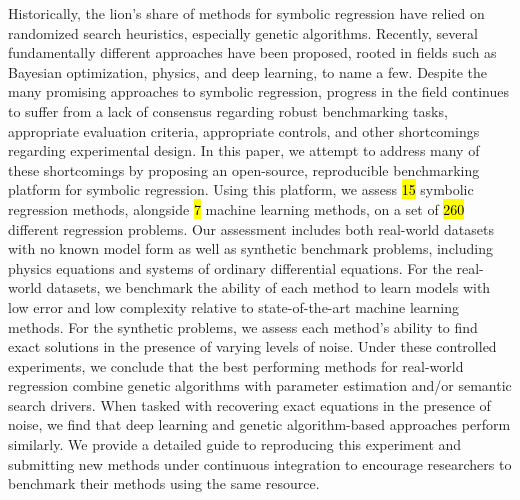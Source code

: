 Historically, the lion's share of methods for symbolic regression have relied on randomized search heuristics, especially genetic algorithms.
Recently, several fundamentally different approaches have been proposed, rooted in fields such as Bayesian optimization, physics, and deep learning, to name a few. 
Despite the many promising approaches to symbolic regression, progress in the field continues to suffer from a lack of consensus regarding robust benchmarking tasks, appropriate evaluation criteria, appropriate controls, and other shortcomings regarding experimental design. 
In this paper, we attempt to address many of these shortcomings by proposing an open-source, reproducible benchmarking platform for symbolic regression.
Using this platform, we assess \hl{15} symbolic regression methods, alongside \hl{7} machine learning methods, on a set of \hl{260} different regression problems. %
Our assessment includes both real-world datasets with no known model form as well as synthetic benchmark problems, including physics equations and systems of ordinary differential equations. 
For the real-world datasets, we benchmark the ability of each method to learn models with low error and low complexity relative to state-of-the-art machine learning methods. 
For the synthetic problems, we assess each method's ability to find exact solutions in the presence of varying levels of noise. 
Under these controlled experiments, we conclude that the best performing methods for real-world regression combine genetic algorithms with parameter estimation and/or semantic search drivers. 
When tasked with recovering exact equations in the presence of noise, we find that deep learning and genetic algorithm-based approaches perform similarly. 
We provide a detailed guide to reproducing this experiment and submitting new methods under continuous integration to encourage researchers to benchmark their methods using the same resource.
